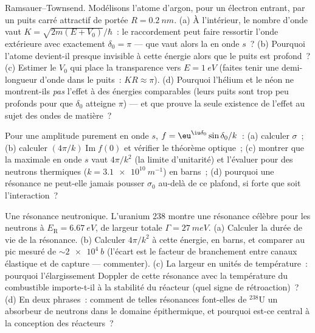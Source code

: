 \begin{exercise}[$\star\star$]\label{exo:b3:scattering-theory:8}
Ramsauer--Townsend. Modélisons l'atome d'argon, pour un électron
entrant, par un puits carré attractif de portée $R =
\qty{0.2}{nm}$. (a) À l'intérieur, le nombre d'onde vaut $K =
\sqrt{2m(E + V_0)}/\hbar$~: le raccordement peut faire ressortir
l'onde extérieure avec exactement $\delta_0 = \pi$ --- que vaut alors
la  en onde $s$~? (b) Pourquoi l'atome devient-il
presque invisible à cette énergie alors que le puits est profond~? (c)
Estimer le $V_0$ qui place la transparence vers $E = \qty{1}{eV}$
(faites tenir une demi-longueur d'onde dans le puits~:
$KR \approx \pi$). (d) Pourquoi l'hélium et le néon ne montrent-ils
\emph{pas} l'effet à des énergies comparables (leurs puits sont trop
peu profonds pour que $\delta_0$ atteigne $\pi$) --- et que prouve la
seule existence de l'effet au sujet des ondes de matière~?
\end{exercise}

\begin{exercise}[$\star\star$]\label{exo:b3:scattering-theory:9}
Pour une amplitude purement en onde $s$, $f = \eu^{\iu\delta_0}\sin\delta_0/
k$~: (a) calculer $\sigma$~; (b) calculer $(4\pi/k)\operatorname{Im}
f(0)$ et vérifier le théorème optique~; (c) montrer que la  maximale en onde $s$ vaut $4\pi/k^2$ (la limite d'unitarité)
et l'évaluer pour des neutrons thermiques ($k = \qty{3.1e10}{m^{-1}}$)
en barns~; (d) pourquoi une résonance ne peut-elle jamais pousser
$\sigma_0$ au-delà de ce plafond, si forte que soit l'interaction~?
\end{exercise}

\begin{exercise}[$\star\star\star$]\label{exo:b3:scattering-theory:10}
Une résonance neutronique. L'uranium 238 montre une résonance célèbre
pour les neutrons à $E_{\text{R}} = \qty{6.67}{eV}$, de largeur totale
$\Gamma = \qty{27}{meV}$. (a) Calculer la durée de vie de la
résonance. (b) Calculer $4\pi/k^2$ à cette énergie, en barns, et
comparer au pic mesuré de $\sim\qty{2e4}{b}$ (l'écart est le facteur
de branchement entre canaux élastique et de capture --- commenter).
(c) La largeur en unités de température~: pourquoi l'élargissement
Doppler de cette résonance avec la température du combustible
importe-t-il à la stabilité du réacteur (quel signe de rétroaction)~?
(d) En deux phrases~: comment de telles résonances font-elles de
$^{238}$U un absorbeur de neutrons dans le domaine épithermique, et
pourquoi est-ce central à la conception des réacteurs~?
\end{exercise}

